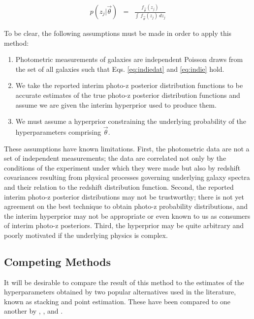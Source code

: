 \documentclass[preprint]{aastex}
\begin{document}
\begin{eqnarray}
\label{eq:params}
p(z_{j}|\vec{\theta}) &=& \frac{f_{\vec{\theta}}(z_{j})}{\int\ 
f_{\vec{\theta}}(z_{j})\ dz_{j}}
\end{eqnarray}

To be clear, the following assumptions must be made in order to apply this 
method:

\begin{enumerate}
\item Photometric measurements of galaxies are independent Poisson draws from 
the set of all galaxies such that Eqs. \ref{eq:indiedat} and \ref{eq:indie} 
hold.
\item We take the reported interim photo-z posterior distribution functions to 
be accurate estimates of the true photo-z posterior distribution functions and 
assume we are given the interim hyperprior used to produce them.
\item We must assume a hyperprior constraining the underlying probability of 
the hyperparameters comprising $\vec{\theta}$.
\end{enumerate}

These assumptions have known limitations.  First, the photometric data are not 
a set of independent measurements; the data are correlated not only by the 
conditions of the experiment under which they were made but also by redshift 
covariances resulting from physical processes governing underlying galaxy 
spectra and their relation to the redshift distribution function.  Second, the 
reported interim photo-z posterior distributions may not be trustworthy; there 
is not yet agreement on the best technique to obtain photo-z probability 
distributions, and the interim hyperprior may not be appropriate or even known 
to us as consumers of interim photo-z posteriors.  Third, the hyperprior may be 
quite arbitrary and poorly motivated if the underlying physics is complex.

\clearpage
\subsection{Competing Methods}
\label{sec:sheldon}

It will be desirable to compare the result of this method to the estimates of 
the hyperparameters obtained by two popular alternatives used in the 
literature, known as stacking and point estimation.   These have been compared 
to one another by \citet{Hildebrandt2012}, \citet{Benjamin2013}, and 
\citet{Asorey2016}.
\end{document}
